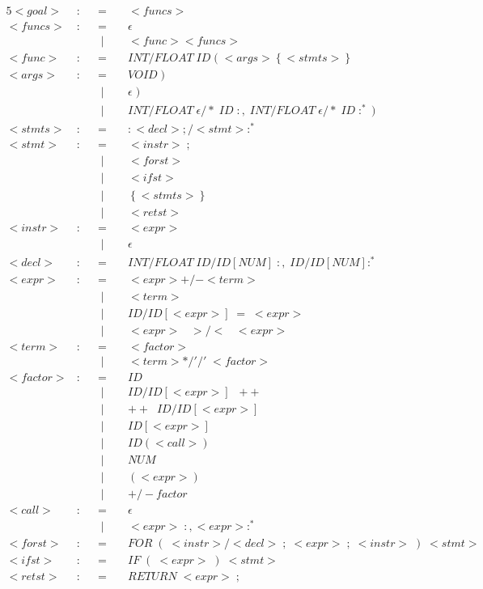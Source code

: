 \documentclass{article}
\begin{document}
\begin{alignat*}{5}
<goal> &:&&=\;&& <funcs>\\
<funcs> &:&&=&&\epsilon\\
&&&\;\vert&& <func><funcs>\\
<func> &:&&= &&INT/FLOAT \; ID \; ( \; <args> \left\{<stmts>\right\}\\
<args> &:&&= &&VOID \; )\\
&&&\;\vert && \epsilon \; )\\
&&&\;\vert && INT/FLOAT\; \epsilon/* \; ID \; :,\; INT/FLOAT\; \epsilon/* \; ID\;:^*\;)\\
<stmts> &:&&=&& :<decl>;/<stmt>:^*\\
<stmt> &:&&=&&<instr>\; ;\\
&&&\;\vert && <forst>\\
&&&\;\vert && <ifst>\\
&&&\;\vert && \left\{<stmts>\right\}\\
&&&\;\vert && <retst>\\
<instr> &:&&=&& <expr>\\
&&&\;\vert && \epsilon\\
<decl> &:&&=&& INT/FLOAT \; ID/ID[NUM] \; :,\; ID/ID[NUM]:^*\\
<expr> &:&&=&& <expr> +/- <term>\\
&&&\;\vert && <term>\\
&&&\;\vert && ID/ID[<expr>] \; = \; <expr>\\
&&&\;\vert && <expr> \;\;\; >/< \;\;\; <expr>\\
<term> &:&&=&& <factor>\\
&&&\;\vert && <term> */'/' \; <factor>\\
<factor> &:&&=&& ID\\
&&&\;\vert && ID/ID[<expr>]\;\;++\\
&&&\;\vert && ++\;\;ID/ID[<expr>]\\
&&&\;\vert && ID[<expr>]\\
&&&\;\vert && ID(<call>)\\
&&&\;\vert && NUM\\
&&&\;\vert && (<expr>)\\
&&&\;\vert && +/-factor\\
<call> &:&&=&& \epsilon\\
&&&\;\vert && <expr> \; :, <expr>:^*\\
<forst> &:&&=&& FOR \; (\; <instr>/<decl>\; ; \; <expr> \; ; \; <instr>\;)\;<stmt>\\
<ifst> &:&&=&& IF\;(\;<expr>\;)\;<stmt>\\
<retst> &:&&=&& RETURN\; <expr>\; ;
\end{alignat*}
\end{document}
